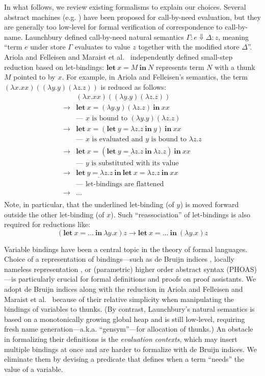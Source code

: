 \documentclass[english]{sumiilab-paper}
\newcommand{\LET}[3]{\mathbf{let}~#1=#2~\mathbf{in}~#3}
\newcommand{\LETBINDING}[2]{\mathbf{let}~#1=#2~\mathbf{in}}
\begin{document}
In what follows, we review existing formalisms to explain our choices. Several abstract machines (e.g. \cite{Johnsson84,PeytonJones92,Fairbairn87}) have been proposed for call-by-need evaluation, but they are generally too low-level for formal verification of correspondence to call-by-name. Launchbury \cite{Launchbury93} defined call-by-need natural semantics $\Gamma : e \Downarrow \Delta : z$, meaning ``term $e$ under store $\Gamma$ evaluates to value $z$ together with the modified store $\Delta$''.
Ariola and Felleisen \cite{Ariola97} and Maraist et al.~\cite{Maraist98} independently defined small-step reduction based on let-bindings: $\LET{x}{M}{N}$ represents term $N$ with a thunk $M$ pointed to by $x$.
For example, in Ariola and Felleisen's semantics, the term
$(\lambda x.xx)((\lambda y.y)(\lambda z.z))$
is reduced as follows:
\[ \begin{array}{ll}
	& (\lambda x.xx)((\lambda y.y)(\lambda z.z)) \\
	\rightarrow & \LET{x}{(\lambda y.y)(\lambda z.z)}{xx} \\
	& \mbox{--- $x$ is bound to $(\lambda y.y)(\lambda z.z)$} \\
	\rightarrow & \LET{x}{(\LET{y}{\lambda z.z}{y})}{xx} \\
	& \mbox{--- $x$ is evaluated and $y$ is bound to $\lambda z.z$} \\
	\rightarrow & \LET{x}{(\underline{\LETBINDING{y}{\lambda z.z}}~\lambda z.z)}{xx} \\
	& \mbox{--- $y$ is substituted with its value} \\
	\rightarrow & \underline{\LETBINDING{y}{\lambda z.z}}~\LET{x}{\lambda z.z}{xx} \\
	& \mbox{--- let-bindings are flattened} \\
	\rightarrow & \dots \\
\end{array} \]
Note, in particular, that the underlined let-binding (of $y$) is moved forward outside the other let-binding (of $x$).  Such ``reassociation'' of let-bindings is also required for reductions like: \[(\LET{x}{\dots}{\lambda y.x})z \rightarrow \LET{x}{\dots}{(\lambda y.x)z}\]

Variable bindings have been a central topic in the theory of formal languages.  Choice of a representation of bindings---such as de Bruijn indices \cite{deBruijn72}, locally nameless representation \cite{Gordon93,Mckinna99,McBride04}, or (parametric) higher order abstract syntax (PHOAS) \cite{Pfenning88,Chlipala08}---is particularly crucial for formal definitions and proofs on proof assistants.
We adopt de Bruijn indices along with the reduction in Ariola and Felleisen \cite{Ariola97} and Maraist et al.~\cite{Maraist98} because of their relative simplicity when manipulating the bindings of variables to thunks.  (By contrast, Launchbury's natural semantics is based on a monotonically growing global heap and is still low-level, requiring fresh name generation---a.k.a. ``gensym''---for allocation of thunks.)
An obstacle in formalizing their definitions is the \emph{evaluation contexts}, which may insert multiple bindings at once and are harder to formalize with de Bruijn indices.  We eliminate them by devising a predicate that defines when a term ``needs'' the value of a variable.
\end{document}
